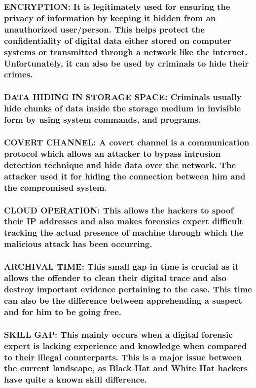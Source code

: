 \documentclass[10pt,british,english]{article}
\begin{document}
\subsubsection{ENCRYPTION: It is legitimately used for ensuring the privacy of information
by keeping it hidden from an unauthorized user/person. This helps
protect the confidentiality of digital data either stored on computer
systems or transmitted through a network like the internet. Unfortunately,
it can also be used by criminals to hide their crimes.}

\subsubsection{DATA HIDING IN STORAGE SPACE: Criminals usually hide chunks of data
inside the storage medium in invisible form by using system commands,
and programs.}

\subsubsection{COVERT CHANNEL: A covert channel is a communication protocol which
allows an attacker to bypass intrusion detection technique and hide
data over the network. The attacker used it for hiding the connection
between him and the compromised system.}

\subsubsection{CLOUD OPERATION: This allows the hackers to spoof their IP \foreignlanguage{british}{addresses}
and also makes forensics expert difficult tracking the actual presence
of machine through which the malicious attack has been occurring.}

\subsubsection{ARCHIVAL TIME: This small gap in time is crucial as it allows the
offender to clean their digital trace and also destroy important evidence
pertaining to the case. This time can also be the difference between
apprehending a suspect and for him to be going free.}

\subsubsection{SKILL GAP: This mainly occurs when a digital forensic expert is lacking
experience and knowledge when compared to their illegal counterparts.
This is a major issue between the current landscape, as Black Hat
and White Hat hackers have quite a known skill difference.}
\end{document}
